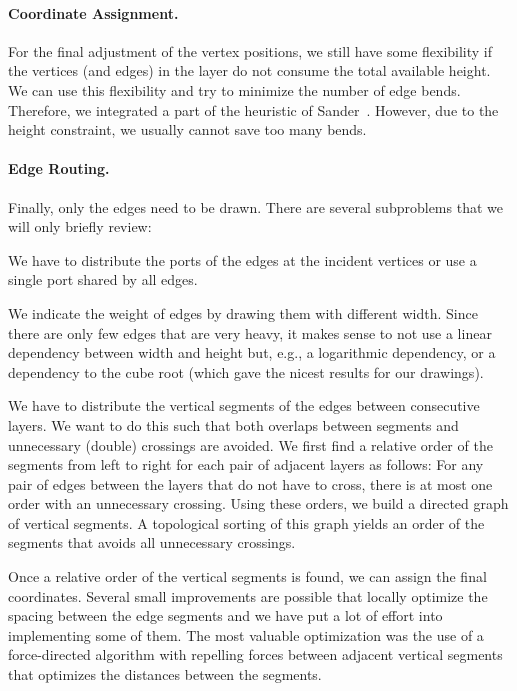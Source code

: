 \documentclass[]{llncs}
\begin{document}
\paragraph{Coordinate Assignment.}
For the final adjustment of the vertex positions, we still have some
flexibility if the vertices (and edges) in the layer do not consume
the total available height. We can use this flexibility and try to
minimize the number of edge bends.
Therefore, we integrated a part of the
heuristic of Sander~\cite{sander1996fast}. However, due to the height
constraint, we usually cannot save too many bends.


\paragraph{Edge Routing.}
Finally, only the edges need to be drawn. There are several
subproblems that we will only briefly review:
\begin{compactitem}
  \item We have to distribute the ports of the edges at the incident
    vertices or use a single port shared by all edges.
  \item We indicate the weight of edges by drawing them with
    different width. Since there are only few edges that are very
    heavy, it makes sense to not use a linear dependency between width
    and height but, e.g., a logarithmic dependency, or a dependency to
    the cube root (which gave the nicest results for our drawings).
  \item We have to distribute the vertical segments of the edges
    between consecutive layers. We want to do this such that
    both overlaps between segments and unnecessary (double) crossings
    are avoided. We first find a relative order of the
    segments from left to right for each pair of adjacent layers as
    follows: For any pair of edges between the layers that do not have
    to cross, there is at most one order with an
    unnecessary crossing. Using these orders, we build a directed
    graph of vertical segments. A topological sorting of this graph
    yields an order of the segments that avoids all unnecessary
    crossings.

    Once a relative order of the vertical segments is found, we can
    assign the final coordinates. Several small improvements are
    possible that locally optimize the spacing between the edge
    segments and we have put a lot of effort into implementing
    some of them.  The most valuable optimization was the use of a
    force-directed algorithm with repelling forces between adjacent
    vertical segments that optimizes the distances between the
    segments.
\end{compactitem}
\end{document}
